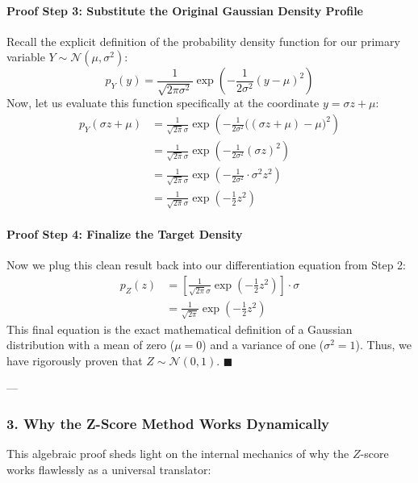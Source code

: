 \documentclass{article}
\begin{document}
\paragraph{Proof Step 3: Substitute the Original Gaussian Density Profile}
Recall the explicit definition of the probability density function for our primary variable $Y \sim \mathcal{N}(\mu, \sigma^2)$:
\begin{equation}
    p_Y(y) = \frac{1}{\sqrt{2\pi\sigma^2}} \exp\left( -\frac{1}{2\sigma^2}(y - \mu)^2 \right)
\end{equation}
Now, let us evaluate this function specifically at the coordinate $y = \sigma z + \mu$:
\begin{align}
    p_Y(\sigma z + \mu) &= \frac{1}{\sqrt{2\pi}\sigma} \exp\left( -\frac{1}{2\sigma^2}\big((\sigma z + \mu) - \mu\big)^2 \right) \\
    &= \frac{1}{\sqrt{2\pi}\sigma} \exp\left( -\frac{1}{2\sigma^2}(\sigma z)^2 \right) \\
    &= \frac{1}{\sqrt{2\pi}\sigma} \exp\left( -\frac{1}{2\sigma^2} \cdot \sigma^2 z^2 \right) \\
    &= \frac{1}{\sqrt{2\pi}\sigma} \exp\left( -\frac{1}{2}z^2 \right)
\end{align}

\paragraph{Proof Step 4: Finalize the Target Density}
Now we plug this clean result back into our differentiation equation from Step 2:
\begin{align}
    p_Z(z) &= \left[ \frac{1}{\sqrt{2\pi}\sigma} \exp\left( -\frac{1}{2}z^2 \right) \right] \cdot \sigma \\
    &= \frac{1}{\sqrt{2\pi}} \exp\left( -\frac{1}{2}z^2 \right)
\end{align}
This final equation is the exact mathematical definition of a Gaussian distribution with a mean of zero ($\mu=0$) and a variance of one ($\sigma^2=1$). Thus, we have rigorously proven that $Z \sim \mathcal{N}(0, 1)$. $\blacksquare$

---

\subsubsection*{3. Why the Z-Score Method Works Dynamically}

This algebraic proof sheds light on the internal mechanics of why the $Z$-score works flawlessly as a universal translator:
\end{document}
